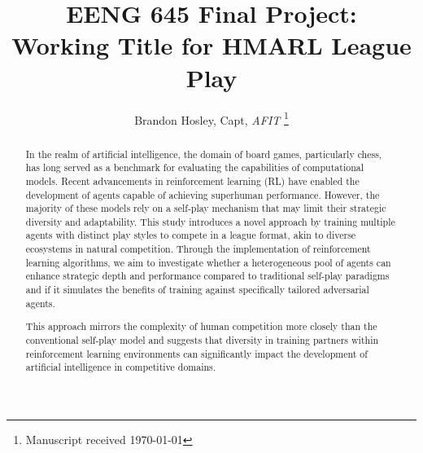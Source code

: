 \documentclass[journal]{IEEEtran}
\title{EENG 645 Final Project: \\Working Title for HMARL League Play}
\author{Brandon Hosley, Capt, \textit{AFIT}%
	\thanks{Manuscript received \today%
}}
\begin{document}
	
	\maketitle
	
	
	\begin{abstract}
		
		In the realm of artificial intelligence, the domain of board games, particularly chess, 
		has long served as a benchmark for evaluating the capabilities of computational models.
		Recent advancements in reinforcement learning (RL) have enabled the development of 
		agents capable of achieving superhuman performance. 
		However, the majority of these models rely on a self-play mechanism 
		that may limit their strategic diversity and adaptability. 
		This study introduces a novel approach by training multiple agents with distinct 
		play styles to compete in a league format, akin to diverse ecosystems in natural competition. 
		Through the implementation of reinforcement learning algorithms, 
		we aim to investigate whether a heterogeneous pool of agents can enhance strategic depth 
		and performance compared to traditional self-play paradigms and if it simulates the benefits of 
		training against specifically tailored adversarial agents. 
		\begin{comment}
		We developed several agents, each with a unique play style—aggressive, defensive, positional, and tactical—trained within a multi-agent reinforcement learning framework. 
		The performance of these agents was evaluated based on their win rates, Elo ratings, Glicko ratings, and their ability to adapt and counter a variety of opponent strategies. 
		Our results indicate that the inclusion of diverse play styles not only elevates the overall performance of individual agents in league play but also encourages the emergence of innovative strategies and adaptability.
		\end{comment}
		This approach mirrors the complexity of human competition more closely than the conventional self-play model and suggests that diversity in training partners within reinforcement learning environments can significantly impact the development of artificial intelligence in competitive domains.
		
	\end{abstract}
	
\end{document}
